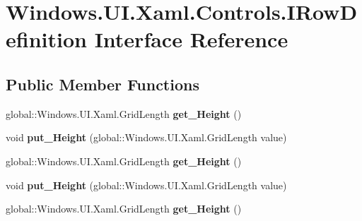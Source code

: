 \hypertarget{interface_windows_1_1_u_i_1_1_xaml_1_1_controls_1_1_i_row_definition}{}\section{Windows.\+U\+I.\+Xaml.\+Controls.\+I\+Row\+Definition Interface Reference}
\label{interface_windows_1_1_u_i_1_1_xaml_1_1_controls_1_1_i_row_definition}
\subsection*{Public Member Functions}
\begin{DoxyCompactItemize}
\item 
\mbox{\label{interface_windows_1_1_u_i_1_1_xaml_1_1_controls_1_1_i_row_definition_a59da0b59c797fb8c8172aacf08bbc676}} 
global\+::\+Windows.\+U\+I.\+Xaml.\+Grid\+Length {\bfseries get\+\_\+\+Height} ()
\item 
\mbox{\label{interface_windows_1_1_u_i_1_1_xaml_1_1_controls_1_1_i_row_definition_a86970b3726ca9461fb38040164d3ebdd}} 
void {\bfseries put\+\_\+\+Height} (global\+::\+Windows.\+U\+I.\+Xaml.\+Grid\+Length value)
\item 
\mbox{\label{interface_windows_1_1_u_i_1_1_xaml_1_1_controls_1_1_i_row_definition_a59da0b59c797fb8c8172aacf08bbc676}} 
global\+::\+Windows.\+U\+I.\+Xaml.\+Grid\+Length {\bfseries get\+\_\+\+Height} ()
\item 
\mbox{\label{interface_windows_1_1_u_i_1_1_xaml_1_1_controls_1_1_i_row_definition_a86970b3726ca9461fb38040164d3ebdd}} 
void {\bfseries put\+\_\+\+Height} (global\+::\+Windows.\+U\+I.\+Xaml.\+Grid\+Length value)
\item 
\mbox{\label{interface_windows_1_1_u_i_1_1_xaml_1_1_controls_1_1_i_row_definition_a59da0b59c797fb8c8172aacf08bbc676}} 
global\+::\+Windows.\+U\+I.\+Xaml.\+Grid\+Length {\bfseries get\+\_\+\+Height} ()

\end{DoxyCompactItemize}
